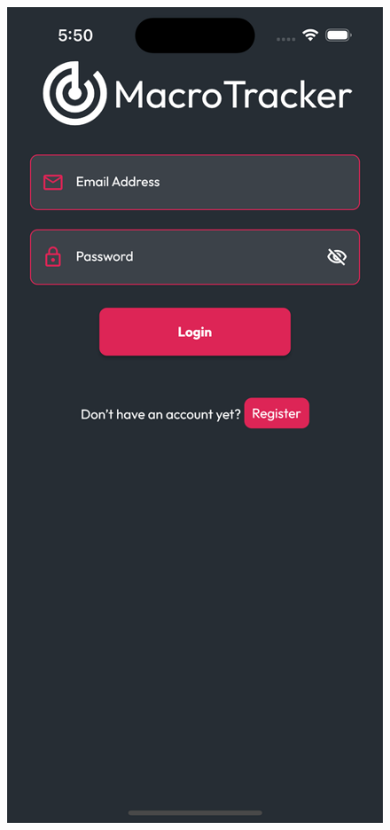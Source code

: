 \documentclass{Configuration_Files/PoliMi3i_thesis}
\begin{document}
\begin{figure}[!ht]
  \centering
  \includegraphics[scale=0.1]{Images/Screenshots/Mobile/Login.png}

\end{figure}
\end{document}
